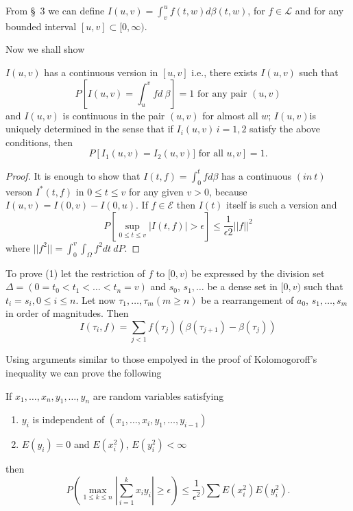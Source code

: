 From \S\ 3 we can define $I(u, v) = \int_{v}^{u} f (t, w)d \beta (t,
w)$, for $f \in \mathscr{L}$ and for any bounded interval $[ u , v]
\subset [ 0, \infty )$.  

Now we shall show 
\setcounter{thm}{0}
\begin{thm}\label{chap5-sec4-thm1}%
  $I (u, v)$ has a continuous version in $[ u, v]$ i.e., there
  exists $I(u, v)$ such that  
  $$
  P[ I(u, v ) = \int^v_u f d ~ \beta ] = 1 \text{ for any pair } (u, v )
  $$
  and $I(u, v)$ is continuous in the pair $(u, v )$ for almost all $w$;
  $I(u, v)$\pageoriginale is uniquely determined in the sense that if
  $I_i (u, v)\, i = 1, 2$ satisfy the above conditions, then  
  $$
  P\left[ I_1 (u, v ) = I_2 (u, v ) ] \text{ for all } u, v \right] = 1. 
  $$
\end{thm}

\begin{proof} %
  It is enough to show that $I(t, f) = \int^t_0 f d \beta$ has a
  continuous $(in\ t)$ verson $I^* (t, f)$ in $0 \leq t \leq v$ for
  any given $v > 0$, because $I (u, v) = I (0, v) - I(0, u)$. If $f
  \in \mathscr{E} $ then $I(t)$ itself is such a version and  
  \begin{equation*}
    P[\sup_{ 0 \leq t \leq v} | I (t, f) | > \epsilon ] \leq
    \frac{1}{\epsilon 2}|| f ||^2 \tag{1} 
  \end{equation*}
where $|| f^2 || = \int^v_0 \int_\Omega f^2 dt\  dP$. 
\end{proof}

To prove (1) let the restriction of $f$ to $[ 0, v)$ be expressed by
  the division set $\Delta = (0 = t_0 < t_1 < \ldots < t_n = v)$
  and $s_0$, $s_1,\ldots$ be a dense set in $[0, v)$ such that $t_i =
    s_i ,0\leq i \leq n$. Let now $\tau_{1},\ldots,\tau_{m}(m\geq n)$
    be a rearrangement of $a_{0}$, $s_{1},\ldots,s_{m}$ in order of
    magnitudes. Then  
    $$
    I(\tau_i, f) = \sum_{ j < 1} f (\tau _ j) (\beta (\tau_{ j +1}) -
    \beta (\tau_j)) 
    $$

Using arguments similar to those empolyed in the proof of
Kolomogoroff's inequality we can prove the following  

\begin{lemma*}%
If $x_1,\ldots,x_n,y_1,\ldots,y_n$ are random variables satisfying 
  \begin{enumerate}
\renewcommand{\labelenumi}{(\theenumi)}
\item $y_i$ is independent of $(x_1,\ldots, x_i,y_1,\ldots,y_{ i - 1})$ 

\item $E(y_i) = 0$ and $E(x^2_i)$, $E(y^2_i) < \infty$
\end{enumerate}
then 
$$
P \left(\max_{ 1 \leq k \leq n} | \sum^k_{ i = 1} x_i y_i | \geq \epsilon
\right) \leq \frac{1}{\epsilon^2}) \sum E(x^2_i) E(y^2_i).  
$$\pageoriginale
\end{lemma*}


